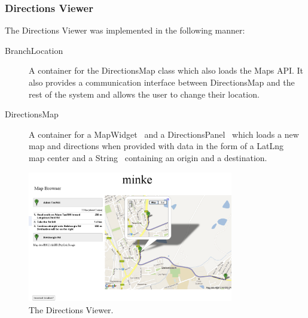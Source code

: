 \subsubsection{Directions Viewer}
The Directions Viewer was implemented in the following manner:
\begin{description}
\item[BranchLocation] A container for the DirectionsMap class which also loads
the Maps API. It also provides a communication interface between DirectionsMap
and the rest of the system and allows the user to change their location.
\item[DirectionsMap] A container for a MapWidget~\cite{mwidget} and a
DirectionsPanel~\cite{dpanel} which loads a new map and directions when 
provided with data in the form of a LatLng~\cite{latlng} map center and a
String~\cite{string} containing an origin and a destination.
\end{description}
\begin{figure}[h!]
\centering
\includegraphics[width=0.8\textwidth]{gwt-map.png}
\caption{The Directions Viewer.}
\end{figure}